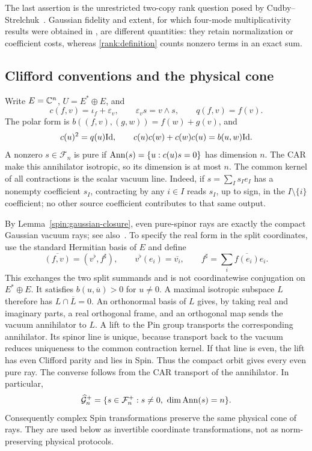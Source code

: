 The last assertion is the unrestricted two-copy rank question posed by
Cudby--Strelchuk~\cite{cudby2023}. Gaussian fidelity and extent, for which
four-mode multiplicativity results were obtained in
\cite{diaskoenig2024,reardon2024}, are different quantities: they retain
normalization or coefficient costs, whereas \eqref{rank:definition} counts
nonzero terms in an exact sum.

\subsection{Clifford conventions and the physical cone}

Write $E=\mathbb C^n$, $U=E^*\oplus E$, and
\begin{equation}
 c(f,v)=\iota_f+\varepsilon_v,\qquad
 \varepsilon_v s=v\wedge s,\qquad q(f,v)=f(v).
 \label{rank:clifford}
\end{equation}
The polar form is
$b((f,v),(g,w))=f(w)+g(v)$, and
\begin{equation}
 c(u)^2=q(u)\mathrm{Id},\qquad
 c(u)c(w)+c(w)c(u)=b(u,w)\mathrm{Id}.
 \label{rank:car}
\end{equation}
A nonzero $s\in\mathcal F_n$ is pure if
$\operatorname{Ann}(s)=\{u:c(u)s=0\}$ has dimension $n$.
The CAR make this annihilator isotropic, so its dimension is at most $n$.
The common kernel of all contractions is the scalar vacuum line. Indeed,
if $s=\sum_I s_Ie_I$ has a nonempty coefficient $s_I$, contracting by any
$i\in I$ reads $s_I$, up to sign, in the $I\setminus\{i\}$ coefficient;
no other source coefficient contributes to that same output.

By Lemma~\ref{spin:gaussian-closure}, even pure-spinor rays are exactly the
compact Gaussian vacuum rays; see also~\cite{hackl2021}.
To specify the real form in the split coordinates, use the standard
Hermitian basis of $E$ and define
\[
 \overline{(f,v)}=(v^\flat,f^\sharp),\qquad
 v^\flat(e_i)=\overline{v_i},\qquad
 f^\sharp=\sum_i\overline{f(e_i)}e_i.
\]
This exchanges the two split summands and is not coordinatewise
conjugation on $E^*\oplus E$. It satisfies
$b(u,\overline u)>0$ for $u\ne0$. A maximal isotropic subspace $L$ therefore
has $L\cap\overline L=0$. An orthonormal basis of $L$ gives, by taking real
and imaginary parts, a real orthogonal frame, and an orthogonal map sends
the vacuum annihilator to $L$. A lift to the Pin group transports the
corresponding annihilator. Its spinor line is unique, because transport
back to the vacuum reduces uniqueness to the common contraction kernel.
If that line is even, the lift has even Clifford parity and lies in Spin.
Thus the compact orbit gives every even pure ray. The converse follows
from the CAR transport of the annihilator. In particular,
\begin{equation}
 \widehat{\mathcal G}_n^+
 =\{s\in\mathcal F_n^+:s\ne0,\ \dim\operatorname{Ann}(s)=n\}.
 \label{rank:cone}
\end{equation}
Consequently complex Spin transformations preserve the same physical cone
of rays. They are used below as invertible coordinate transformations,
not as norm-preserving physical protocols.

